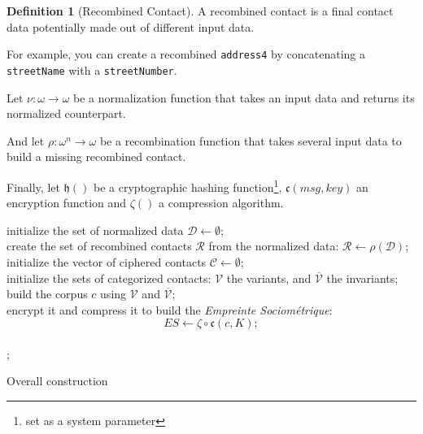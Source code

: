 \documentclass[twoside,twocolumn]{article}
\theoremstyle{definition}
\newtheorem{definition}{Definition}
\theoremstyle{remark}
\begin{document}
\begin{definition}[Recombined Contact]
    \label{recombinedContact}
    A recombined contact is a final contact data potentially made out of different input data.

    For example, you can create a recombined \texttt{address4} by concatenating a \texttt{streetName} with a \texttt{streetNumber}.
\end{definition}

Let $\nu: \omega \to \omega$ be a normalization function that takes an input data and returns its normalized counterpart.

And let $\rho: \omega^n \to \omega$ be a recombination function that takes several input data to build a missing recombined contact.

Finally, let $\mathfrak{h}()$ be a cryptographic hashing function\footnote{set as a system parameter}, $\mathfrak{c}(msg,key)$ an encryption function 
and $\zeta()$ a compression algorithm.

\begin{algorithm}
    initialize the set of normalized data $\mathcal{D} \gets \emptyset$; \\
    create the set of recombined contacts $\mathcal{R}$ from the normalized data: $\mathcal{R} \gets \rho(\mathcal{D})$; \\
    initialize the vector of ciphered contacts $\mathcal{C} \gets \emptyset$; \\
    initialize the sets of categorized contacts: $\mathcal{V}$ the variants, and $\overline{\mathcal{V}}$ the invariants; \\
    build the corpus $c$ using $\mathcal{V}$ and $\overline{\mathcal{V}}$; \\
    encrypt it and compress it to build the \emph{Empreinte Sociométrique}:$$
        ES \gets \zeta \circ \mathfrak{c}(c, K);
    $$ \\
    ;
    \caption{Overall construction}
    \label{algo:es}
\end{algorithm}
\end{document}
